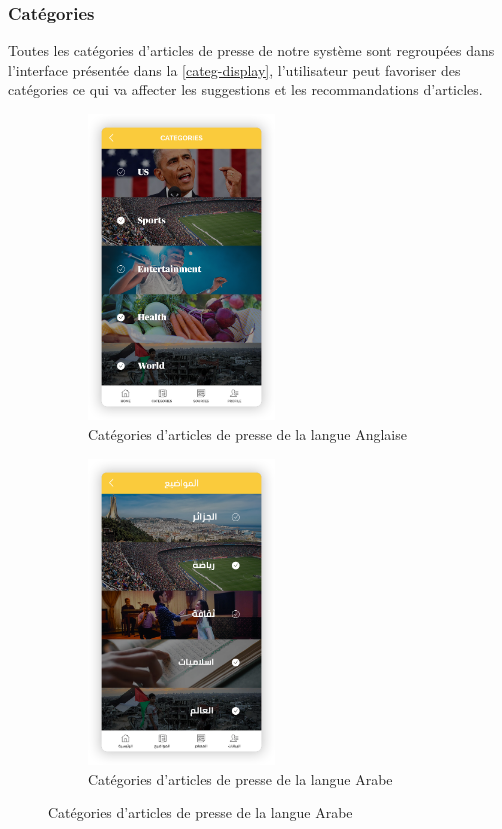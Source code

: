    \subsubsection{Catégories}
Toutes les catégories d'articles de presse de notre système sont regroupées dans l'interface présentée dans la \autoref{categ-display}, l'utilisateur peut favoriser des catégories ce qui va affecter les suggestions et les recommandations d'articles. 
\begin{figure}[H]
    \begin{minipage}{0.48\textwidth}
        \begin{figure}[H]
            \centering
            \includegraphics[width=140pt]{img/chapter4/feedny/en-categ.png}
            \caption{Catégories d'articles de presse de la langue Anglaise}
        \end{figure}
    \end{minipage}\hfill
    \begin {minipage}{0.48\textwidth}
    \begin{figure}[H]
        \centering
        \includegraphics[width=140pt]{img/chapter4/feedny/ar-categ.png}
        \caption{Catégories d'articles de presse de la langue Arabe}
    \end{figure}
\end{minipage}
\label{categ-display}
\end{figure}

